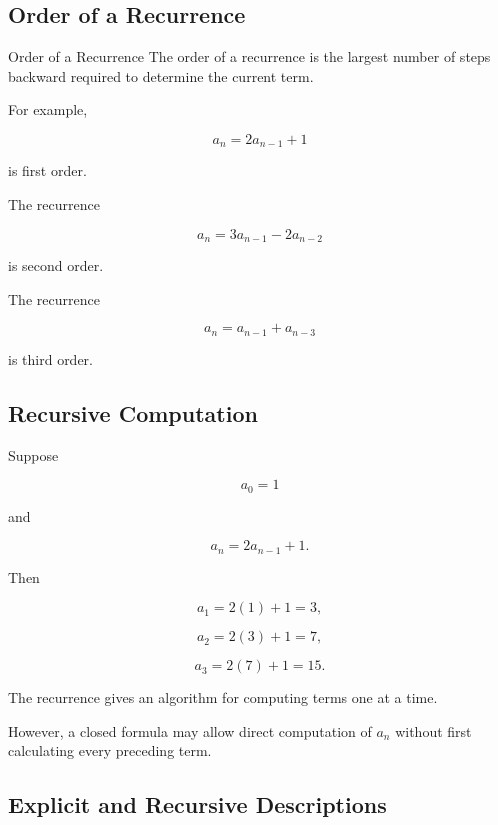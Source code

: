 \subsection{Order of a Recurrence}
\label{subsec:order-recurrence}

\begin{definitionbox}{Order of a Recurrence}
The order of a recurrence is the largest number of steps backward
required to determine the current term.
\end{definitionbox}

For example,

\[
a_n=2a_{n-1}+1
\]

is first order.

The recurrence

\[
a_n=3a_{n-1}-2a_{n-2}
\]

is second order.

The recurrence

\[
a_n=a_{n-1}+a_{n-3}
\]

is third order.

\subsection{Recursive Computation}
\label{subsec:recursive-computation}

Suppose

\[
a_0=1
\]

and

\[
a_n=2a_{n-1}+1.
\]

Then

\[
a_1=2(1)+1=3,
\]

\[
a_2=2(3)+1=7,
\]

\[
a_3=2(7)+1=15.
\]

The recurrence gives an algorithm for computing terms one at a time.

However, a closed formula may allow direct computation of \(a_n\)
without first calculating every preceding term.

\subsection{Explicit and Recursive Descriptions}
\label{subsec:explicit-recursive}

